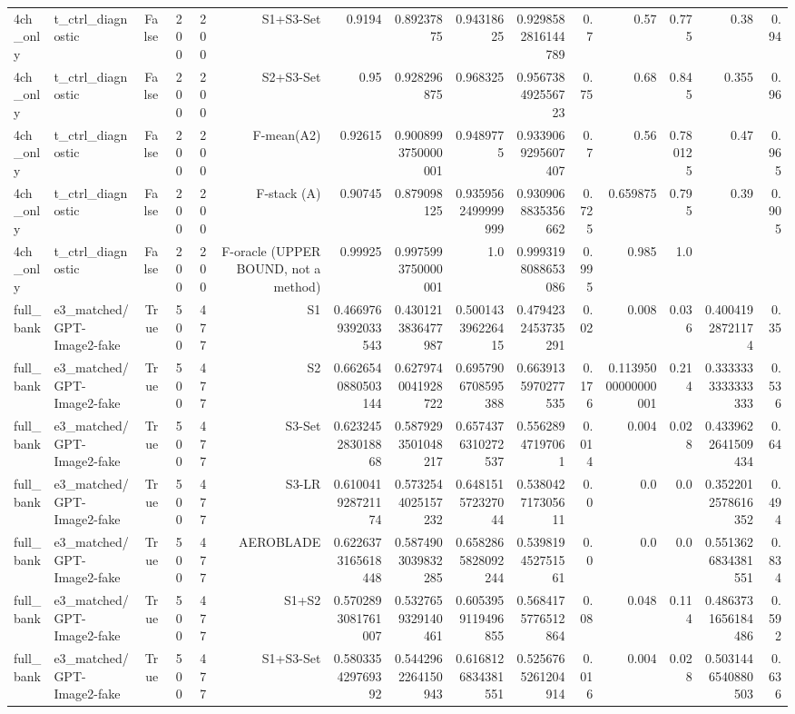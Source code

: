 \begin{table}[htbp]
\begin{tabular}{llrrrrrrrrrrrrr}
4ch\_only & t\_ctrl\_diagnostic & False & 200 & 200 & S1+S3-Set & 0.9194 & 0.89237875 & 0.94318625 & 0.9298582816144789 & 0.7 & 0.57 & 0.775 & 0.38 & 0.94 \\
4ch\_only & t\_ctrl\_diagnostic & False & 200 & 200 & S2+S3-Set & 0.95 & 0.928296875 & 0.968325 & 0.956738492556723 & 0.75 & 0.68 & 0.845 & 0.355 & 0.96 \\
4ch\_only & t\_ctrl\_diagnostic & False & 200 & 200 & F-mean(A2) & 0.92615 & 0.9008993750000001 & 0.9489775 & 0.9339069295607407 & 0.7 & 0.56 & 0.780125 & 0.47 & 0.965 \\
4ch\_only & t\_ctrl\_diagnostic & False & 200 & 200 & F-stack (A) & 0.90745 & 0.879098125 & 0.9359562499999999 & 0.9309068835356662 & 0.725 & 0.659875 & 0.795 & 0.39 & 0.905 \\
4ch\_only & t\_ctrl\_diagnostic & False & 200 & 200 & F-oracle (UPPER BOUND, not a method) & 0.99925 & 0.9975993750000001 & 1.0 & 0.9993198088653086 & 0.995 & 0.985 & 1.0 &  &  \\
full\_bank & e3\_matched/GPT-Image2-fake & True & 500 & 477 & S1 & 0.4669769392033543 & 0.4301213836477987 & 0.500143396226415 & 0.4794232453735291 & 0.02 & 0.008 & 0.036 & 0.40041928721174 & 0.35 \\
full\_bank & e3\_matched/GPT-Image2-fake & True & 500 & 477 & S2 & 0.6626540880503144 & 0.6279740041928722 & 0.6957906708595388 & 0.6639135970277535 & 0.176 & 0.11395000000000001 & 0.214 & 0.3333333333333333 & 0.536 \\
full\_bank & e3\_matched/GPT-Image2-fake & True & 500 & 477 & S3-Set & 0.623245283018868 & 0.5879293501048217 & 0.6574376310272537 & 0.55628947197061 & 0.014 & 0.004 & 0.028 & 0.4339622641509434 & 0.64 \\
full\_bank & e3\_matched/GPT-Image2-fake & True & 500 & 477 & S3-LR & 0.610041928721174 & 0.5732544025157232 & 0.648151572327044 & 0.538042717305611 & 0.0 & 0.0 & 0.0 & 0.3522012578616352 & 0.494 \\
full\_bank & e3\_matched/GPT-Image2-fake & True & 500 & 477 & AEROBLADE & 0.6226373165618448 & 0.5874903039832285 & 0.6582865828092244 & 0.539819452751561 & 0.0 & 0.0 & 0.0 & 0.5513626834381551 & 0.834 \\
full\_bank & e3\_matched/GPT-Image2-fake & True & 500 & 477 & S1+S2 & 0.5702893081761007 & 0.5327659329140461 & 0.6053959119496855 & 0.5684175776512864 & 0.08 & 0.048 & 0.114 & 0.4863731656184486 & 0.592 \\
full\_bank & e3\_matched/GPT-Image2-fake & True & 500 & 477 & S1+S3-Set & 0.580335429769392 & 0.5442962264150943 & 0.6168126834381551 & 0.5256765261204914 & 0.016 & 0.004 & 0.028 & 0.5031446540880503 & 0.636 \\

\end{tabular}
\end{table}
